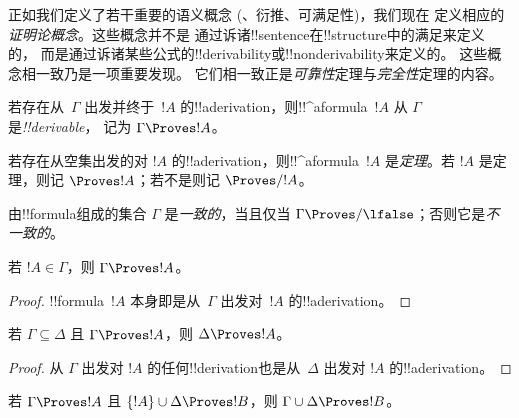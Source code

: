 \documentclass[../../../include/open-logic-section]{subfiles}
\begin{document}
      {}
      {}


\begin{explain}
正如我们定义了若干重要的语义概念
(、衍推、可满足性)，我们现在
定义相应的\emph{证明论概念}。这些概念并不是
通过诉诸!!{sentence}在!!{structure}中的满足来定义的，
而是通过诉诸某些公式的!!{derivability}或!!{nonderivability}来定义的。
这些概念相一致乃是一项重要发现。
它们相一致正是\emph{可靠性}定理与\emph{完全性}定理的内容。
\end{explain}

\begin{defn}[!!^{derivability}]
若存在从~$\Gamma$ 出发并终于~$!A$ 的!!a{derivation}，则!!^a{formula}~$!A$ 从 $\Gamma$ 是\emph{!!{derivable}}，
记为 $\Gamma \Proves !A$。
\end{defn}

\begin{defn}[定理]
若存在从空集出发的对 $!A$ 的!!a{derivation}，则!!^a{formula}~$!A$ 是\emph{定理}。若 $!A$ 是定理，则记
$\Proves !A$；若不是则记 $\Proves/ !A$。
\end{defn}

\begin{defn}[一致性]
由!!{formula}组成的集合 $\Gamma$ 是\emph{一致的}，当且仅当
$\Gamma\Proves/ \lfalse$；否则它是\emph{不一致的}。
\end{defn}

\begin{prop}[自反性]
若 $!A \in \Gamma$，则 $\Gamma \Proves !A$。
\end{prop}

\begin{proof}
  !!{formula}~$!A$ 本身即是从~$\Gamma$ 出发对~$!A$ 的!!a{derivation}。
\end{proof}

\begin{prop}[单调性]
若 $\Gamma \subseteq \Delta$ 且 $\Gamma \Proves !A$，则 $\Delta
\Proves !A$。
\end{prop}

\begin{proof}
从 $\Gamma$ 出发对 $!A$ 的任何!!{derivation}也是从~$\Delta$ 出发对
$!A$ 的!!a{derivation}。
\end{proof}

\begin{prop}[传递性]
若 $\Gamma \Proves !A$ 且 $\{!A\} \cup \Delta \Proves
!B$，则 $\Gamma \cup \Delta \Proves !B$。
\end{prop}
\end{document}
